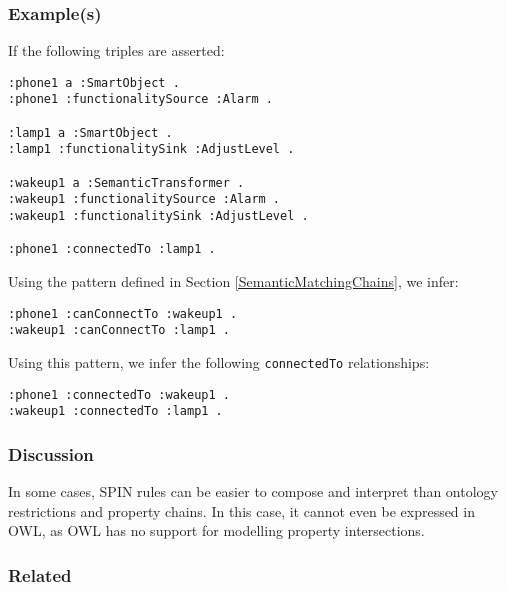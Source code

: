 \subsubsection{Example(s)}

If the following triples are asserted:

\begin{verbatim}
:phone1 a :SmartObject .
:phone1 :functionalitySource :Alarm .

:lamp1 a :SmartObject .
:lamp1 :functionalitySink :AdjustLevel .

:wakeup1 a :SemanticTransformer .
:wakeup1 :functionalitySource :Alarm .
:wakeup1 :functionalitySink :AdjustLevel .

:phone1 :connectedTo :lamp1 .
\end{verbatim}

Using the pattern defined in Section \ref{SemanticMatchingChains}, we infer:

\begin{verbatim}
:phone1 :canConnectTo :wakeup1 .
:wakeup1 :canConnectTo :lamp1 .
\end{verbatim}

Using this pattern, we infer the following \texttt{connectedTo} relationships:

\begin{verbatim}
:phone1 :connectedTo :wakeup1 .
:wakeup1 :connectedTo :lamp1 .
\end{verbatim}

\subsubsection{Discussion}

% 
In some cases, \ac{SPIN} rules can be easier to compose and interpret than ontology restrictions and property chains. In this case, it cannot even be expressed in \ac{OWL}, as \ac{OWL} has no support for modelling property intersections.

\subsubsection{Related} 

